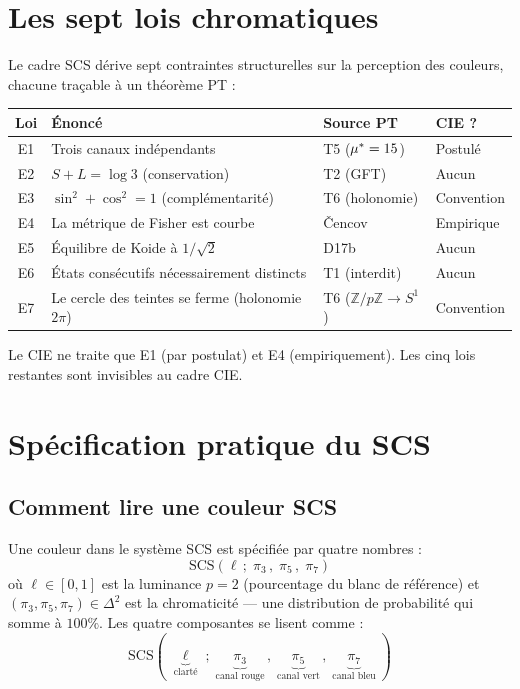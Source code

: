 \documentclass[12pt,a4paper]{article}
\begin{document}
\section{Les sept lois chromatiques}
\label{sec:laws}

Le cadre SCS d\'erive sept contraintes structurelles sur la perception
des couleurs, chacune tra\c{c}able \`a un th\'eor\`eme PT :

\begin{center}
\begin{tabular}{clll}
\toprule
\textbf{Loi} & \textbf{\'Enonc\'e} & \textbf{Source PT} & \textbf{CIE ?} \\
\midrule
E1 & Trois canaux ind\'ependants & T5 (${\mu^{*}} = 15$) & Postul\'e \\
E2 & $S + L = \log 3$ (conservation) & T2 (GFT) & Aucun \\
E3 & $\sin^2 + \cos^2 = 1$ (compl\'ementarit\'e) & T6 (holonomie) & Convention \\
E4 & La m\'etrique de Fisher est courbe & \v{C}encov & Empirique \\
E5 & \'Equilibre de Koide \`a $1/\sqrt{2}$ & D17b & Aucun \\
E6 & \'Etats cons\'ecutifs n\'ecessairement distincts & T1 (interdit) & Aucun \\
E7 & Le cercle des teintes se ferme (holonomie $2\pi$) & T6 ($\mathbb{Z}/p\mathbb{Z} \to S^1$) & Convention \\
\bottomrule
\end{tabular}
\end{center}

Le CIE ne traite que E1 (par postulat) et E4 (empiriquement). Les cinq
lois restantes sont invisibles au cadre CIE.

\section{Sp\'ecification pratique du SCS}
\label{sec:practical}

\subsection{Comment lire une couleur SCS}

Une couleur dans le syst\`eme SCS est sp\'ecifi\'ee par quatre nombres :
\begin{equation}
  \mathrm{SCS}(\ell\,;\; \pi_3\,,\; \pi_5\,,\; \pi_7)
\end{equation}
o\`u $\ell \in [0,1]$ est la luminance $p=2$ (pourcentage du blanc de
r\'ef\'erence) et $(\pi_3, \pi_5, \pi_7) \in \Delta^2$ est la
chromaticit\'e --- une distribution de probabilit\'e qui somme \`a
$100\%$. Les quatre composantes se lisent comme :
\[
  \mathrm{SCS}(\;\underbrace{\ell}_{\text{clart\'e}}\;;\;
  \underbrace{\pi_3}_{\text{canal rouge}}\,,\;
  \underbrace{\pi_5}_{\text{canal vert}}\,,\;
  \underbrace{\pi_7}_{\text{canal bleu}}\;)
\]
\end{document}
